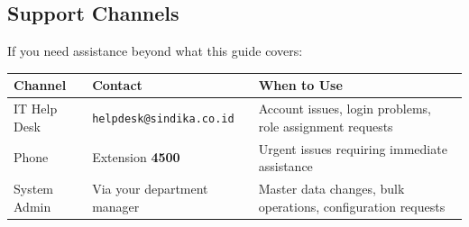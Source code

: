 \subsection{Support Channels}

If you need assistance beyond what this guide covers:

\begin{tabularx}{\textwidth}{@{} l l X @{}}
  \toprule
  \textbf{Channel} & \textbf{Contact}
    & \textbf{When to Use} \\
  \midrule
  IT Help Desk
    & \texttt{helpdesk@sindika.co.id}
    & Account issues, login problems, role assignment
      requests \\
  Phone
    & Extension \textbf{4500}
    & Urgent issues requiring immediate assistance \\
  System Admin
    & Via your department manager
    & Master data changes, bulk operations, configuration
      requests \\
  \bottomrule
\end{tabularx}

\newpage
